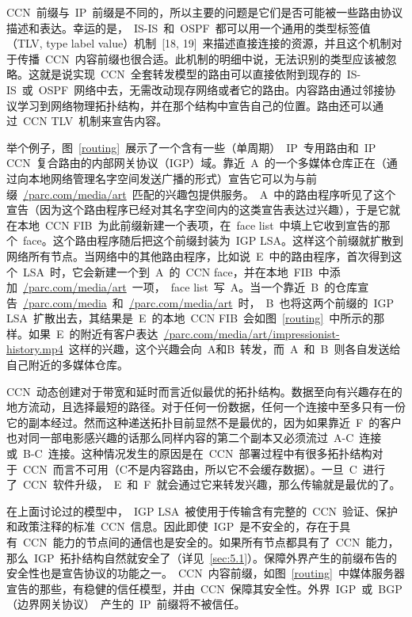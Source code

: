 CCN~前缀与~IP~前缀是不同的，所以主要的问题是它们是否可能被一些路由协议描述和表达。幸运的是，~IS-IS~和~OSPF~都可以用一个通用的类型标签值（TLV, type label value）机制~[18, 19]~来描述直接连接的资源，并且这个机制对于传播~CCN~内容前缀也很合适。此机制的明细中说，无法识别的类型应该被忽略。这就是说实现~CCN~全套转发模型的路由可以直接依附到现存的~IS-IS~或~OSPF~网络中去，无需改动现存网络或者它的路由。内容路由通过邻接协议学习到网络物理拓扑结构，并在那个结构中宣告自己的位置。路由还可以通过~CCN TLV~机制来宣告内容。

举个例子，图~\ref{routing}~展示了一个含有一些（单周期）~IP~专用路由和~IP CCN~复合路由的内部网关协议（IGP）域。靠近~A~的一个多媒体仓库正在（通过向本地网络管理名字空间发送广播的形式）宣告它可以为与前缀~\url{/parc.com/media/art}~匹配的兴趣包提供服务。~A~中的路由程序听见了这个宣告（因为这个路由程序已经对其名字空间内的这类宣告表达过兴趣），于是它就在本地~CCN FIB~为此前缀新建一个表项，在~face list~中填上它收到宣告的那个~face。这个路由程序随后把这个前缀封装为~IGP LSA。这样这个前缀就扩散到网络所有节点。当网络中的其他路由程序，比如说~E~中的路由程序，首次得到这个~LSA~时，它会新建一个到~A~的~CCN face，并在本地~FIB~中添加~\url{/parc.com/media/art}~一项，~face list~写~A。当一个靠近~B~的仓库宣告~\url{/parc.com/media}~和~\url{/parc.com/media/art}~时，~B~也将这两个前缀的~IGP LSA~扩散出去，其结果是~E~的本地~CCN FIB~会如图~\ref{routing}~中所示的那样。如果~E~的附近有客户表达~\url{/parc.com/media/art/impressionist-history.mp4}~这样的兴趣，这个兴趣会向~A和B~转发，而~A~和~B~则各自发送给自己附近的多媒体仓库。%

CCN~动态创建对于带宽和延时而言近似最优的拓扑结构。数据至向有兴趣存在的地方流动，且选择最短的路径。对于任何一份数据，任何一个连接中至多只有一份它的副本经过。然而这种递送拓扑目前显然不是最优的，因为如果靠近~F~的客户也对同一部电影感兴趣的话那么同样内容的第二个副本又必须流过~A-C~连接或~B-C~连接。这种情况发生的原因是在~CCN~部署过程中有很多拓扑结构对于~CCN~而言不可用（C不是内容路由，所以它不会缓存数据）。一旦~C~进行了~CCN~软件升级，~E~和~F~就会通过它来转发兴趣，那么传输就是最优的了。%

在上面讨论过的模型中，~IGP LSA~被使用于传输含有完整的~CCN~验证、保护和政策注释的标准~CCN~信息。因此即使~IGP~是不安全的，存在于具有~CCN~能力的节点间的通信也是安全的。如果所有节点都具有了~CCN~能力，那么~IGP~拓扑结构自然就安全了（详见~\ref{sec:5.1}）。保障外界产生的前缀布告的安全性也是宣告协议的功能之一。~CCN~内容前缀，如图~\ref{routing}~中媒体服务器宣告的那些，有稳健的信任模型，并由~CCN~保障其安全性。外界~IGP~或~BGP（边界网关协议）~产生的~IP~前缀将不被信任。

